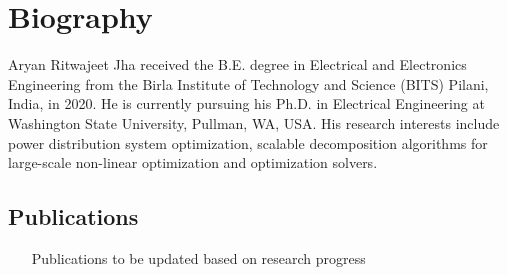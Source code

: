 \section{Biography}
\small
Aryan Ritwajeet Jha received the B.E. degree in Electrical and Electronics Engineering from the Birla Institute of Technology and Science (BITS) Pilani, India, in 2020. He is currently pursuing his Ph.D. in Electrical Engineering at Washington State University, Pullman, WA, USA. His research interests include power distribution system optimization, scalable decomposition algorithms for large-scale non-linear optimization and optimization solvers.
\singlespacing

\subsection{Publications}
\small
\begin{enumerate}
    \item [Publications to be updated based on research progress]
\end{enumerate}

  
\clearpage
